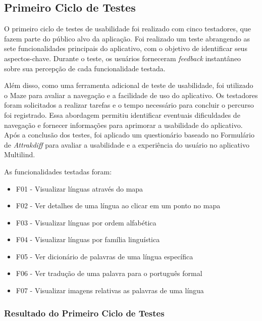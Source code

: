 \subsection{Primeiro Ciclo de Testes}
\label{sec:Primeiro Ciclo}
O primeiro ciclo de testes de usabilidade foi realizado com cinco testadores, que fazem parte do público alvo da aplicação. Foi realizado um teste abrangendo as sete funcionalidades 
principais do aplicativo, com o objetivo de identificar seus aspectos-chave. Durante o teste, os usuários forneceram \textit{feedback} instantâneo sobre sua percepção de cada funcionalidade testada. 

Além disso, como uma ferramenta adicional de teste de usabilidade, foi utilizado o Maze para avaliar a navegação e a facilidade de uso do aplicativo. Os testadores foram solicitados a realizar  
tarefas e o tempo necessário para concluir o percurso foi registrado. Essa abordagem permitiu identificar eventuais dificuldades de navegação e fornecer informações para aprimorar a usabilidade do aplicativo.
Após a conclusão dos testes, foi aplicado um questionário baseado no Formulário de \textit{Attrakdiff} para avaliar a usabilidade e a experiência do usuário no aplicativo Multilind.

\begin{description}
    \item As funcionalidades testadas foram:
	\begin{itemize}
		\item F01 - Visualizar línguas através do mapa
		\item F02 - Ver detalhes de uma língua ao clicar em um ponto no mapa
		\item F03 - Visualizar línguas por ordem alfabética
		\item F04 - Visualizar línguas por família linguística
		\item F05 - Ver dicionário de palavras de uma língua específica
		\item F06 - Ver tradução de uma palavra para o português formal
		\item F07 - Visualizar imagens relativas as palavras de uma língua
	\end{itemize}
\end{description}

\subsubsection{Resultado do Primeiro Ciclo de Testes}
\label{sec:Resultado do Primeiro Ciclo de Testes}
